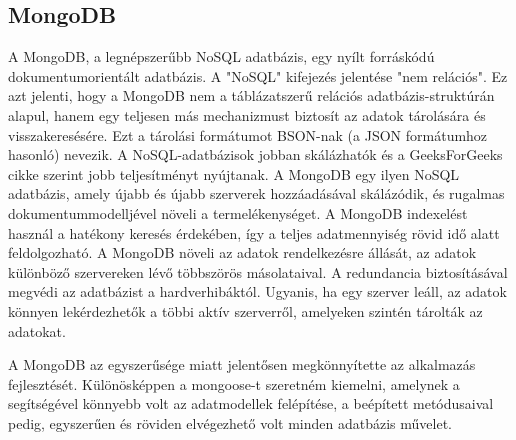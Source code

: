 \subsection{MongoDB}
A MongoDB, a legnépszerűbb NoSQL adatbázis, egy nyílt forráskódú dokumentumorientált adatbázis. A "NoSQL" kifejezés jelentése "nem relációs". Ez azt jelenti, hogy a MongoDB nem a táblázatszerű relációs adatbázis-struktúrán alapul, hanem egy teljesen más mechanizmust biztosít az adatok tárolására és visszakeresésére. Ezt a tárolási formátumot BSON-nak (a JSON formátumhoz hasonló) nevezik. A NoSQL-adatbázisok jobban skálázhatók és a GeeksForGeeks cikke szerint\cite{MongoDB} jobb teljesítményt nyújtanak. A MongoDB egy ilyen NoSQL adatbázis, amely újabb és újabb szerverek hozzáadásával skálázódik, és rugalmas dokumentummodelljével növeli a termelékenységet. A MongoDB indexelést használ a hatékony keresés érdekében, így a teljes adatmennyiség rövid idő alatt feldolgozható. A MongoDB növeli az adatok rendelkezésre állását, az adatok különböző szervereken lévő többszörös másolataival. A redundancia biztosításával megvédi az adatbázist a hardverhibáktól. Ugyanis, ha egy szerver leáll, az adatok könnyen lekérdezhetők a többi aktív szerverről, amelyeken szintén tárolták az adatokat. 

A MongoDB az egyszerűsége miatt jelentősen megkönnyítette az alkalmazás fejlesztését. Különösképpen a mongoose-t \cite{Mongoose} szeretném kiemelni, amelynek a segítségével könnyebb volt az adatmodellek felépítése, a beépített metódusaival pedig, egyszerűen és röviden elvégezhető volt minden adatbázis művelet.
\cite{MongoDB}
